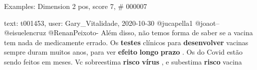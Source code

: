 \begin{frame}{Examples: Dimension 2 pos, score 7, \# 000007}
\footnotesize
\begin{exampleblock}{text: t001453, user: Gary\_Vitalidade, 2020-10-30}
@jucapella1 @joaot-- @eisuelencruz @RenanPeixoto- Além disso, não temos forma 
de saber se a vacina tem nada de medicamente errado. Os \textbf{testes} 
clínicos para \textbf{desenvolver} vacinas sempre duram muitos anos, para ver 
\textbf{efeito} \textbf{longo} \textbf{prazo} . Os do Covid estão sendo feitos 
em meses. Vc sobreestima \textbf{risco} \textbf{vírus} , e subestima 
\textbf{risco} vacina 
\end{exampleblock}
\end{frame}
